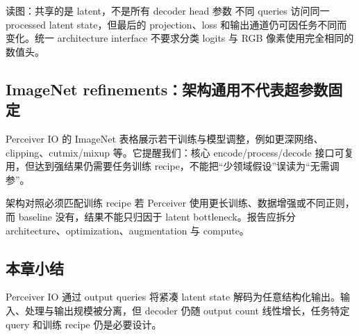 
\begin{knowledgebox}{读图：共享的是 latent，不是所有 decoder head 参数}
不同 queries 访问同一 processed latent state，但最后的 projection、loss 和输出通道仍可因任务不同而变化。统一 architecture interface 不要求分类 logits 与 RGB 像素使用完全相同的数值头。
\end{knowledgebox}

\subsection{ImageNet refinements：架构通用不代表超参数固定}

Perceiver IO 的 ImageNet 表格展示若干训练与模型调整，例如更深网络、clipping、cutmix/mixup 等。它提醒我们：核心 encode/process/decode 接口可复用，但达到强结果仍需要任务训练 recipe，不能把“少领域假设”误读为“无需调参”。


\begin{warningbox}{架构对照必须匹配训练 recipe}
若 Perceiver 使用更长训练、数据增强或不同正则，而 baseline 没有，结果不能只归因于 latent bottleneck。报告应拆分 architecture、optimization、augmentation 与 compute。
\end{warningbox}

\subsection{本章小结}

Perceiver IO 通过 output queries 将紧凑 latent state 解码为任意结构化输出。输入、处理与输出规模被分离，但 decoder 仍随 output count 线性增长，任务特定 query 和训练 recipe 仍是必要设计。

